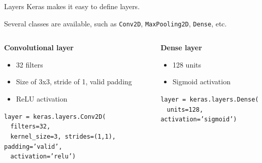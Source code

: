 \documentclass[9pt, aspectratio=169]{beamer}
\begin{document}
\begin{frame}
    {Layers}
    Keras makes it easy to define layers.

    Several classes are available, such as \texttt{Conv2D}, \texttt{MaxPooling2D}, \texttt{Dense}, etc.

    \pause
    \vspace{1em}

    \begin{columns}[t]
        \begin{column}{.5\textwidth}
            \textbf{Convolutional layer}
            \begin{itemize}
                \item 32 filters
                \item Size of 3x3, stride of 1, valid padding
                \item ReLU activation
            \end{itemize}

            \vspace{1em}
            \begin{codebox}
                \texttt{layer = keras.layers.Conv2D(\\
                    $~~~~$filters=32,\\
                    $~~~~$kernel\_size=3, strides=(1,1), $~~~~$padding='valid',\\ $~~~~$activation='relu')
                }
            \end{codebox}
        \end{column}

        \pause

        \begin{column}{.5\textwidth}
            \textbf{Dense layer}
            \begin{itemize}
                \item 128 units
                \item Sigmoid activation
            \end{itemize}

            \vspace{2.5em}
            \begin{codebox}
                \texttt{layer = keras.layers.Dense(\\
                    $~~~~$units=128, activation='sigmoid')}
            \end{codebox}
        \end{column}
    \end{columns}
\end{frame}
\end{document}
